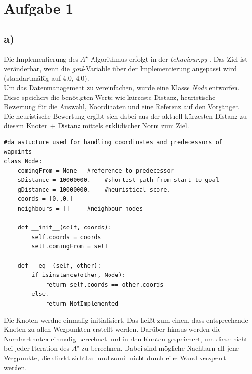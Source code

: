 \documentclass{../Vorlage/mat}
\begin{document}
 \\

\section*{Aufgabe 1}
\subsection*{a)}
\lstset{language=python}
Die Implementierung des $A^{\star}$-Algorithmus erfolgt in der \textit{behaviour.py} . Das Ziel ist veränderbar, wenn die \textit{goal}-Variable über der Implementierung angepasst wird (standartmäßig auf 4.0, 4.0).\\
Um das Datenmanagement zu vereinfachen, wurde eine Klasse \textit{Node} entworfen. Diese speichert die benötigten Werte wie kürzeste Distanz, heuristische Bewertung für die Auswahl, Koordinaten und eine Referenz auf den Vorgänger. Die heuristische Bewertung ergibt sich dabei aus der aktuell kürzesten Distanz zu diesem Knoten + Distanz mittels euklidischer Norm zum Ziel.

\begin{lstlisting}
#datastucture used for handling coordinates and predecessors of wapoints
class Node:
    comingFrom = None   #reference to predecessor
    sDistance = 10000000.    #shortest path from start to goal
    gDistance = 10000000.    #heuristical score.
    coords = [0.,0.]
    neighbours = []     #neighbour nodes

    def __init__(self, coords):
        self.coords = coords
        self.comingFrom = self

    def __eq__(self, other):
        if isinstance(other, Node):
            return self.coords == other.coords
        else:
            return NotImplemented
\end{lstlisting}

Die Knoten werdne einmalig initialisiert. Das heißt zum einen, dass entsprechende Knoten zu allen Wegpunkten erstellt werden. Darüber hinaus werden die Nachbarknoten einmalig berechnet und in den Knoten gespeichert, um diese nicht bei jeder Iteration des $A^{\star}$ zu berechnen. Dabei sind mögliche Nachbarn all jene Wegpunkte, die direkt sichtbar und somit nicht durch eine Wand versperrt werden.
\end{document}
